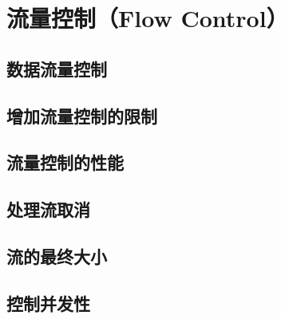 \section{流量控制（Flow Control）}
\subsection{数据流量控制}
\subsection{增加流量控制的限制}
\subsection{流量控制的性能}
\subsection{处理流取消}
\subsection{流的最终大小}
\subsection{控制并发性}